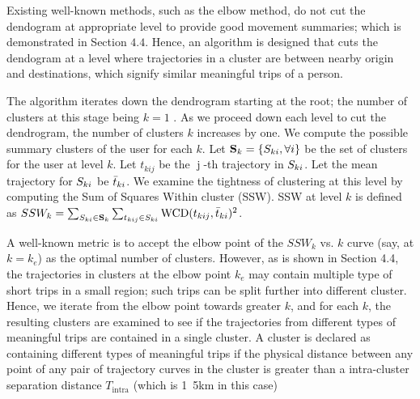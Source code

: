 Existing well-known methods, such as the elbow method, do not cut the dendogram at appropriate level to provide good movement summaries; which is demonstrated in Section $4.4$. Hence, an algorithm is designed that cuts the dendogram at a level where trajectories in a cluster are between nearby origin and destinations, which signify similar meaningful trips of a person.



The algorithm iterates down the dendrogram starting at the root; the number of clusters at this stage being $k=1$ . As we proceed down each level to cut the dendrogram, the number of clusters $k$ increases by one. We compute the possible summary clusters of the user for each $k$. Let $\mathbf{S}_k =  \{ S_{ki}, \forall i \}$ be the set of clusters for the user at level $k$. Let $t_{kij}$ be the $\operatorname{j}$-th trajectory in $S_{ki}$. Let the mean trajectory for $S_{ki}$ be $\bar{t}_{ki}$. We examine the tightness of clustering at this level by computing the Sum of Squares Within cluster (SSW). SSW at level $k$ is defined as $SSW_k=\sum_{S_{ki} \in \mathbf{S}_k} \sum_{t_{kij} \in S_{ki}} \operatorname{WCD}(t_{kij},\bar{t}_{ki})^2$.

A well-known metric is to accept the elbow point of the $SSW_k$ vs. $k$ curve (say, at $k=k_e$) as the optimal number of clusters. However, as is shown in Section 4.4, the trajectories in clusters at the elbow point $k_e$ may contain multiple type of short trips in a small region; such trips can be split further into different cluster. Hence, we iterate from the elbow point towards greater $k$, and for each $k$, the resulting clusters are examined to see if the trajectories from different types of meaningful trips are contained in a single cluster. A cluster is declared as containing different types of meaningful trips if the physical distance between any point of any pair of trajectory curves in the cluster is greater than a intra-cluster separation distance $T_{\operatorname{intra}}$ (which is \unit{1.5}{km} in this case)%

